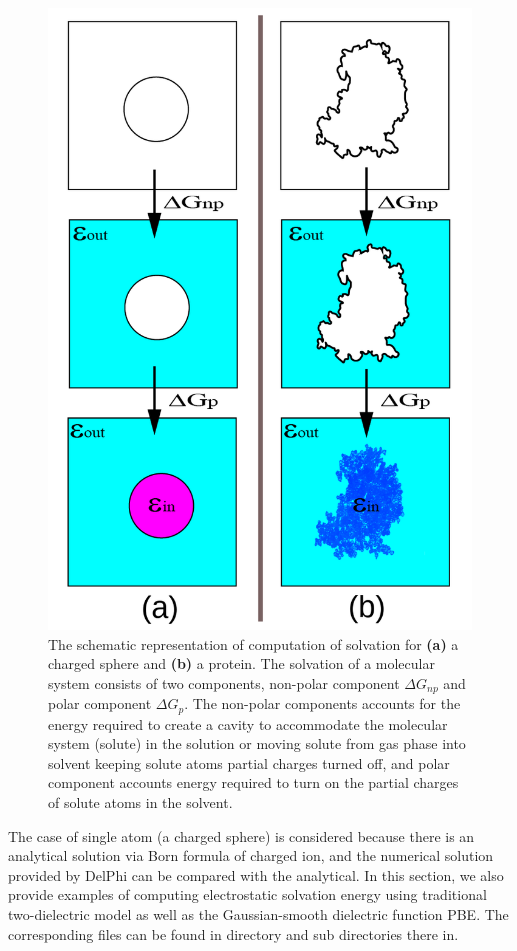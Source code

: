 \documentclass[9pt,tutorial]{livecoms}
\newcommand*\ttvar[1]{\texttt{\expandafter\dottvar\detokenize{#1}\relax}}
\newcommand*\dottvar[1]{\ifx\relax#1\else
  \expandafter\ifx\string_#1\string_\allowbreak\else#1\fi
  \expandafter\dottvar\fi}
\begin{document}
\begin{figure}[hbt!]
\includegraphics[width=\linewidth]{Figure_5.png}
\caption{The schematic representation of computation of solvation for  \textbf{(a)} a charged sphere and \textbf{(b)} a protein. The solvation of a molecular system consists of two  components, non-polar component $ \Delta G_{np} $ and polar component $ \Delta G_p $. The non-polar components accounts for the energy required to create a cavity to accommodate the molecular system (solute) in the solution or moving solute from gas phase into solvent keeping solute atoms partial charges turned off, and polar component accounts energy required to turn on the partial charges of solute atoms in the solvent.}
\label{fig:scheme_polar_solvation}
\end{figure}

The case of single atom (a charged sphere) is considered because there is an analytical solution via Born formula of charged ion, and the numerical solution provided by DelPhi can be compared with the analytical. In this section, we also provide examples of computing electrostatic solvation energy using traditional two-dielectric model as well as the Gaussian-smooth dielectric function PBE. The corresponding files can be found in directory \ttvar{Example_3.1.1/} and sub directories there in.
\end{document}
